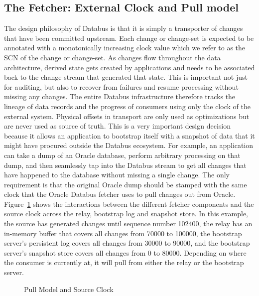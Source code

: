 \subsection{The Fetcher: External Clock and Pull model}

The design philosophy of Databus is that it is simply a transporter of changes that have been committed upstream. Each change or change-set is expected to be annotated with a monotonically increasing clock value which we refer to as the SCN of the change or change-set. As changes flow throughout the data architecture, derived state gets created by applications and needs to be associated back to the change stream that generated that state. This is important not just for auditing, but also to recover from failures and resume processing without missing any changes. 
The entire Databus infrastructure therefore tracks the lineage of data records and the progress of consumers using only the clock of the external system. Physical offsets in transport are only used as optimizations but are never used as source of truth. This is a very important design decision because it allows an application to bootstrap itself with a snapshot of data that it might have procured outside the Databus ecosystem. For example, an application can take a dump of an Oracle database, perform arbitrary processing on that dump, and then seamlessly tap into the Databus stream to get all changes that have happened to the database without missing a single change. The only requirement is that the original Oracle dump should be stamped with the same clock that the Oracle Databus fetcher uses to pull changes out from Oracle. Figure~\ref{fig:pull-model} shows the interactions between the different fetcher components and the source clock across the relay, bootstrap log and snapshot store. In this example, the source has generated changes until sequence number 102400, the relay has an in-memory buffer that covers all changes from 70000 to 100000, the bootstrap server's persistent log covers all changes from 30000 to 90000, and the bootstrap server's snapshot store covers all changes from 0 to 80000. Depending on where the consumer is currently at, it will pull from either the relay or the bootstrap server. 

\begin{figure}
\centering
{}
\caption{Pull Model and Source Clock}
\label{fig:pull-model}
\end{figure}

